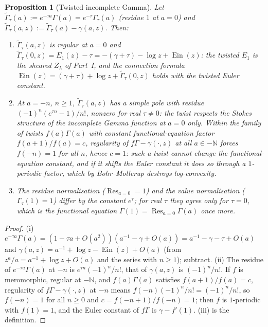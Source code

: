 \documentclass[11pt,a4paper]{article}
\newcommand{\Ein}{\operatorname{Ein}}
\DeclareMathOperator{\Res}{Res}
\newtheorem{proposition}[theorem]{Proposition}
\theoremstyle{definition}
\theoremstyle{remark}
\numberwithin{equation}{section}
\begin{document}
\begin{proposition}[Twisted incomplete Gamma]\label{V:prop:incgamma}
Let $\widetilde\Gamma_\tau(a):=e^{-\tau a}\Gamma(a)=e^{-\tau}\Gamma_\tau(a)$ (residue $1$ at
$a=0$) and $\widetilde\Gamma_\tau(a,z):=\widetilde\Gamma_\tau(a)-\gamma(a,z)$. Then:
\begin{enumerate}[label=(\roman*)]
\item $\widetilde\Gamma_\tau(a,z)$ is regular at $a=0$ and
$\widetilde\Gamma_\tau(0,z)=E_1(z)-\tau=-(\gamma+\tau)-\log z+\Ein(z)$: the twisted
$E_1$ is the sheared $Z_\lambda$ of Part~I, and the connection formula
$\Ein(z)=(\gamma+\tau)+\log z+\widetilde\Gamma_\tau(0,z)$ holds with the twisted Euler
constant.
\item At $a=-n$, $n\ge1$, $\widetilde\Gamma_\tau(a,z)$ has a simple pole with residue
$(-1)^n(e^{\tau n}-1)/n!$, nonzero for real $\tau\ne0$: the twist respects the Stokes
structure of the incomplete Gamma function at $a=0$ only. Within the family of twists $f(a)\Gamma(a)$ with constant
functional-equation factor $f(a+1)/f(a)=c$, regularity of $f\Gamma-\gamma(\cdot,z)$ at all
$a\in-\mathbb N$ forces $f(-n)=1$ for all $n$, hence $c=1$: such a twist cannot change
the functional-equation constant, and if it shifts the Euler constant it does so through a
$1$-periodic factor, which by Bohr--Mollerup destroys log-convexity.
\item The residue normalisation ($\Res_{a=0}=1$) and the value normalisation
($\Gamma_\tau(1)=1$) differ by the constant $e^{\tau}$; for real $\tau$ they agree only
for $\tau=0$, which is the functional equation $\Gamma(1)=\Res_{a=0}\Gamma(a)$ once more.
\end{enumerate}
\end{proposition}
\begin{proof}
(i) $e^{-\tau a}\Gamma(a)=(1-\tau a+O(a^2))(a^{-1}-\gamma+O(a))=a^{-1}-\gamma-\tau+O(a)$ and
$\gamma(a,z)=a^{-1}+\log z-\Ein(z)+O(a)$ (from $z^a/a=a^{-1}+\log z+O(a)$ and the series
with $n\ge1$); subtract. (ii) The residue of $e^{-\tau a}\Gamma(a)$ at $-n$ is
$e^{\tau n}(-1)^n/n!$, that of $\gamma(a,z)$ is $(-1)^n/n!$. If $f$ is meromorphic, regular
at $-\mathbb N$, and $f(a)\Gamma(a)$ satisfies $f(a+1)/f(a)=c$, regularity of
$f\Gamma-\gamma(\cdot,z)$ at $-n$ means
$f(-n)(-1)^n/n!=(-1)^n/n!$, so $f(-n)=1$ for all $n\ge0$ and $c=f(-n+1)/f(-n)=1$; then
$f$ is $1$-periodic with $f(1)=1$, and the Euler constant of $f\Gamma$ is $\gamma-f'(1)$.
(iii) is the definition.
\end{proof}
\end{document}
